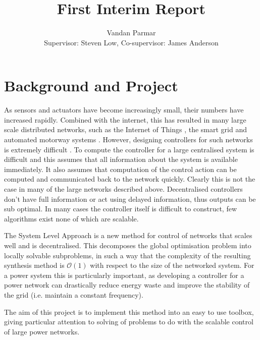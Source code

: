 \documentclass[11pt,a4paper]{article}
\begin{document}
\title{First Interim Report}
\author{Vandan Parmar \\
Supervisor: Steven Low, Co-supervisor: James Anderson}
\maketitle
\section*{Background and Project}
As sensors and actuators have become increasingly small, their numbers have increased rapidly. Combined with the internet, this has resulted in many large scale distributed networks, such as the Internet of Things \cite{Atzori2010}, the smart grid \cite{Amin2005,Farhangi2010} and automated motorway systems \cite{Chien1997}. However, designing controllers for such networks is extremely difficult \cite{Rotkowitz2006}. To compute the controller for a large centralised system is difficult and this assumes that all information about the system is available immediately. It also assumes that computation of the control action can be computed and communicated back to the network quickly. Clearly this is not the case in many of the large networks described above. Decentralised controllers don't have full information or act using delayed information, thus outputs can be sub optimal. In many cases the controller itself is difficult to construct, few algorithms exist none of which are scalable.

The System Level Approach \cite{Wang2016,Wang2017} is a new method for control of networks that scales well and is decentralised. This decomposes the global optimisation problem into locally solvable subproblems, in such a way that the complexity of the resulting synthesis method is $\mathcal{O}(1)$ with respect to the size of the networked system. For a power system this is particularly important, as developing a controller for a power network can drastically reduce energy waste and improve the stability of the grid (i.e. maintain a constant frequency). 

The aim of this project is to implement this method into an easy to use toolbox, giving particular attention to solving of problems to do with the scalable control of large power networks.
\end{document}
